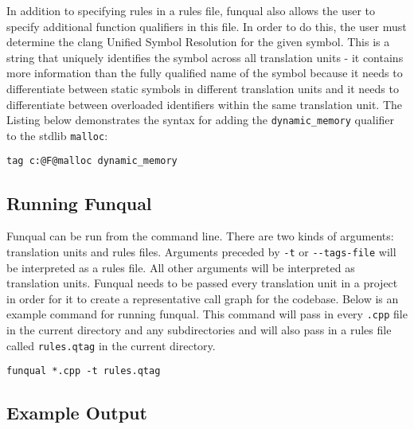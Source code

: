 In addition to specifying rules in a rules file, funqual also allows the user to specify additional function qualifiers in this file.  In order to do this, the user must determine the clang Unified Symbol Resolution for the given symbol.  This is a string that uniquely identifies the symbol across all translation units - it contains more information than the fully qualified name of the symbol because it needs to differentiate between static symbols in different translation units and it needs to differentiate between overloaded identifiers within the same translation unit.  The Listing below demonstrates the syntax for adding the \lstinline{dynamic_memory} qualifier to the stdlib \lstinline{malloc}:

\noindent\begin{minipage}[t]{\linewidth}
\begin{lstlisting}
tag c:@F@malloc dynamic_memory
\end{lstlisting}
\end{minipage}

\subsection{Running Funqual}\label{sec:operate:run}

Funqual can be run from the command line.  There are two kinds of arguments:  translation units and rules files.  Arguments preceded by \lstinline{-t} or \lstinline{--tags-file} will be interpreted as a rules file.  All other arguments will be interpreted as translation units.  Funqual needs to be passed every translation unit in a project in order for it to create a representative call graph for the codebase.  Below is an example command for running funqual.  This command will pass in every \lstinline{.cpp} file in the current directory and any subdirectories and will also pass in a rules file called \lstinline{rules.qtag} in the current directory.

\noindent\begin{minipage}[t]{\linewidth}
\begin{lstlisting}
funqual *.cpp -t rules.qtag
\end{lstlisting}
\end{minipage}

\subsection{Example Output}\label{sec:operate:output}

